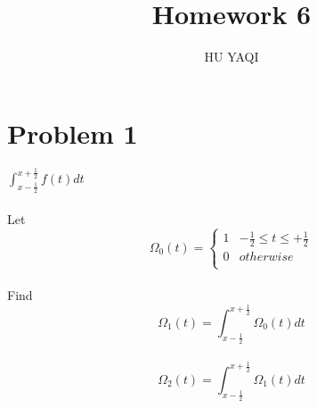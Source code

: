 \documentclass{article}
\title{ Homework 6 }
\author{HU YAQI}
\begin{document}
\maketitle
\setlength{\parindent}{0pt}

\section{ Problem 1 }
$\int_{x-\frac{1}{2}}^{x+\frac{1}{2}} f(t) dt$\\
\\
Let $$\Omega_0(t)=
\left \{
\begin{array}{lr}
1 & -\frac{1}{2}\leq t \leq +\frac{1}{2} \\
0 & otherwise\\
\end{array}
\right.
$$
\\
Find $$\Omega_1(t)=
\int_{x-\frac{1}{2}}^{x+\frac{1}{2}} \Omega_0(t) dt
$$
\\
$$\Omega_2(t)=
\int_{x-\frac{1}{2}}^{x+\frac{1}{2}} \Omega_1(t) dt
$$
\end{document}
